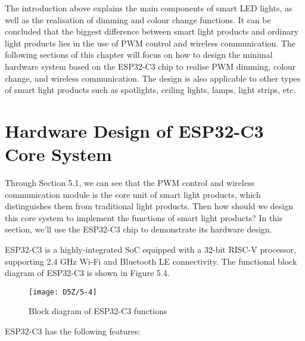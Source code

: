 \documentclass[a4paper,12pt]{book}
\begin{document}
The introduction above explains the main components of smart LED lights, as well as the realisation of dimming and colour change functions. It can be concluded that the biggest difference between smart light products and ordinary light products lies in the use of PWM control and wireless communication. The following sections of this chapter will focus on how to design the minimal hardware system based on the ESP32-C3 chip to realise PWM dimming, colour change, and wireless communication. The design is also applicable to other types of smart light products such as spotlights, ceiling lights, lamps, light strips, etc.

\section{Hardware Design of ESP32-C3 Core System}

Through Section 5.1, we can see that the PWM control and wireless communication module is the core unit of smart light products, which distinguishes them from traditional light products. Then how should we design this core system to implement the functions of smart light products? In this section, we’ll use the ESP32-C3 chip to demonstrate its hardware design.

ESP32-C3 is a highly-integrated SoC equipped with a 32-bit RISC-V processor, supporting 2.4 GHz Wi-Fi and Bluetooth LE connectivity. The functional block diagram of ESP32-C3 is shown in Figure 5.4.

\begin{figure}[h!]
    \centering
    \texttt{[image: D5Z/5-4]}
    \caption{Block diagram of ESP32-C3 functions}
\end{figure}

ESP32-C3 has the following features:
\end{document}
